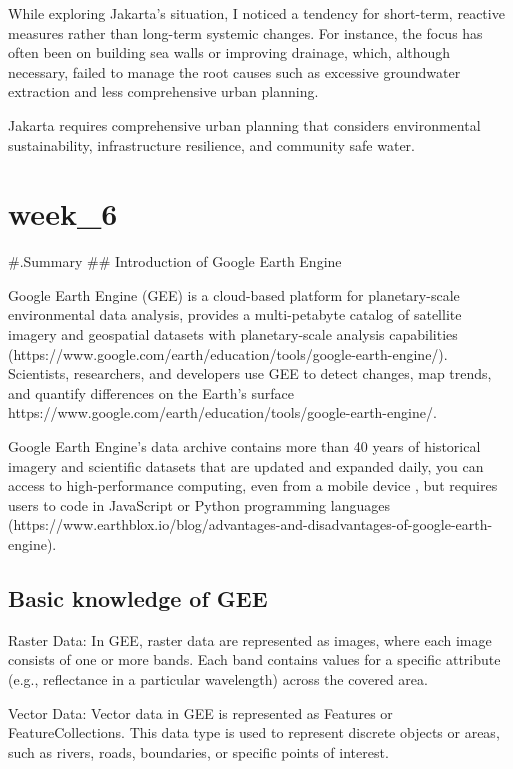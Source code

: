 \documentclass[
  letterpaper,
  DIV=11,
  numbers=noendperiod]{scrreprt}
\begin{document}
While exploring Jakarta's situation, I noticed a tendency for
short-term, reactive measures rather than long-term systemic changes.
For instance, the focus has often been on building sea walls or
improving drainage, which, although necessary, failed to manage the root
causes such as excessive groundwater extraction and less comprehensive
urban planning.

Jakarta requires comprehensive urban planning that considers
environmental sustainability, infrastructure resilience, and community
safe water.


\chapter{week\_6}\label{week_6}

\#.Summary \#\# Introduction of Google Earth Engine

Google Earth Engine (GEE) is a cloud-based platform for planetary-scale
environmental data analysis, provides a multi-petabyte catalog of
satellite imagery and geospatial datasets with planetary-scale analysis
capabilities
(https://www.google.com/earth/education/tools/google-earth-engine/).
Scientists, researchers, and developers use GEE to detect changes, map
trends, and quantify differences on the Earth's surface
https://www.google.com/earth/education/tools/google-earth-engine/.

Google Earth Engine's data archive contains more than 40 years of
historical imagery and scientific datasets that are updated and expanded
daily, you can access to high-performance computing, even from a mobile
device , but requires users to code in JavaScript or Python programming
languages
(https://www.earthblox.io/blog/advantages-and-disadvantages-of-google-earth-engine).

\section{Basic knowledge of GEE}\label{basic-knowledge-of-gee}

Raster Data: In GEE, raster data are represented as images, where each
image consists of one or more bands. Each band contains values for a
specific attribute (e.g., reflectance in a particular wavelength) across
the covered area.

Vector Data: Vector data in GEE is represented as Features or
FeatureCollections. This data type is used to represent discrete objects
or areas, such as rivers, roads, boundaries, or specific points of
interest.
\end{document}
